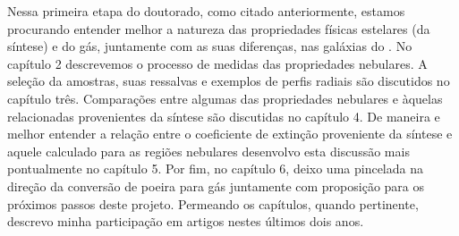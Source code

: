 Nessa primeira etapa do doutorado, como citado anteriormente, estamos procurando entender melhor a
natureza das propriedades físicas estelares (da síntese) e do gás, juntamente com as suas
diferenças, nas galáxias do \PCAL. No capítulo 2 descrevemos o processo de medidas das propriedades
nebulares. A seleção da amostras, suas ressalvas e exemplos de perfis radiais são discutidos no
capítulo três. Comparações entre algumas das propriedades nebulares e àquelas relacionadas
provenientes da síntese são discutidas no capítulo 4. De maneira e melhor entender a relação entre o
coeficiente de extinção proveniente da síntese e aquele calculado para as regiões nebulares
desenvolvo esta discussão mais pontualmente no capítulo 5. Por fim, no capítulo 6, deixo uma
pincelada na direção da conversão de poeira para gás juntamente com proposição para os próximos
passos deste projeto. Permeando os capítulos, quando pertinente, descrevo minha participação em
artigos nestes últimos dois anos.

